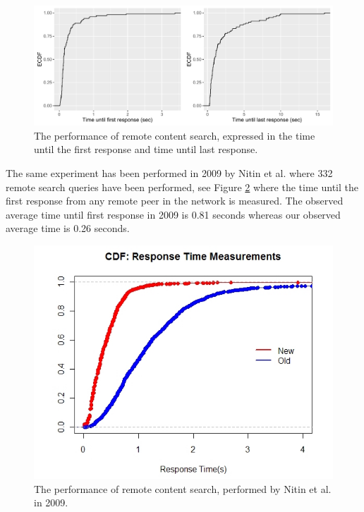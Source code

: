 \begin{figure}[!h]
	\centering
	\includegraphics[width=1.0\columnwidth]{images/experiments/cdf_remote_search}
	\caption{The performance of remote content search, expressed in the time until the first response and time until last response.}
	\label{fig:remote_search}
\end{figure}

The same experiment has been performed in 2009 by Nitin et al. where 332 remote search queries have been performed, see Figure \ref{fig:nitin_remote_search} where the time until the first response from any remote peer in the network is measured. The observed average time until first response in 2009 is 0.81 seconds whereas our observed average time is 0.26 seconds.

\begin{figure}[!h]
	\centering
	\includegraphics[width=0.7\columnwidth]{images/experiments/nitin_remote_search}
	\caption{The performance of remote content search, performed by Nitin et al. in 2009.}
	\label{fig:nitin_remote_search}
\end{figure}

